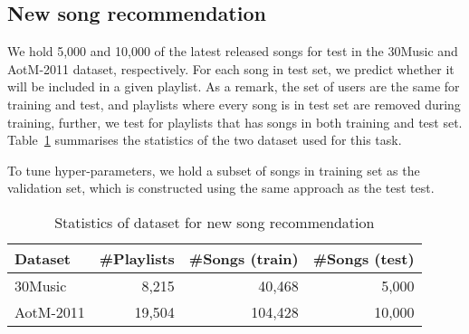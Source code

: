 %





\subsection{New song recommendation}
\label{ssec:newsongrec}

We hold 5,000 and 10,000 of the latest released songs for test in the 30Music and AotM-2011 dataset, respectively.
For each song in test set, we predict whether it will be included in a given playlist.
As a remark, the set of users are the same for training and test, 
and playlists where every song is in test set are removed during training,
further, we test for playlists that has songs in both training and test set.
Table~\ref{tab:stats_newsongrec} summarises the statistics of the two dataset used for this task.

To tune hyper-parameters, we hold a subset of songs in training set as the validation set, 
which is constructed using the same approach as the test test.

\begin{table}[!h]
\centering
\caption{Statistics of dataset for new song recommendation}
\label{tab:stats_newsongrec}
\small
\begin{tabular}{lrrr}
\toprule
Dataset   & \#Playlists & \#Songs (train) & \#Songs (test) \\
\midrule
30Music   & 8,215       & 40,468          & 5,000 \\
AotM-2011 & 19,504      & 104,428         & 10,000 \\
\bottomrule
\end{tabular}
\end{table}

